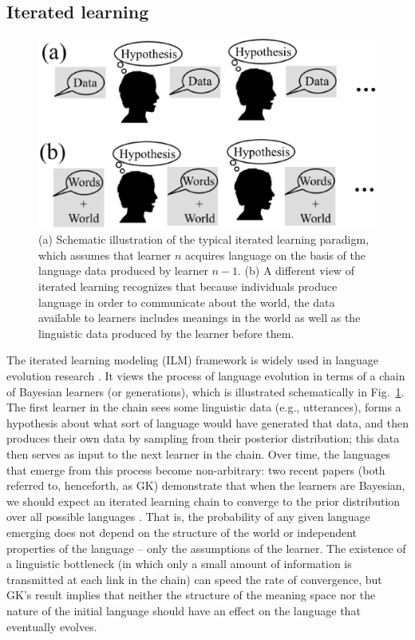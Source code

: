 \documentclass{apa}
\begin{document}
\subsection{Iterated learning}

\begin{figure}[t]
\begin{center}
\includegraphics[scale=0.5]{ilframework.eps}
\end{center}
\vspace{-5mm}
\caption{(a) Schematic illustration of the typical iterated learning paradigm, which assumes that learner $n$ acquires language on the basis of the language data produced by learner $n-1$. (b) A different view of iterated learning recognizes that because individuals produce language in order to communicate about the world, the data available to learners includes meanings in the world as well as the linguistic data produced by the learner before them.}
\label{fig:ilm}
\end{figure}


The iterated learning modeling (ILM) framework is widely used in language evolution research \cite{griffithskalish07, kirbyetal08,kirbyhurford02,smith09,realigriffiths09}. It views the process of language evolution in terms of a chain of Bayesian learners (or generations), which is illustrated schematically in Fig.~\ref{fig:ilm}. The first learner in the chain sees some linguistic data (e.g., utterances), forms a hypothesis about what sort of language would have generated that data, and then produces their own data by sampling from their posterior distribution; this data then serves as input to the next learner in the chain. Over time, the languages that emerge from this process become non-arbitrary: two recent papers (both referred to, henceforth, as GK) demonstrate that when the learners are Bayesian, we should expect an iterated learning chain to converge to the prior distribution over all possible languages \cite{griffithskalish05,griffithskalish07}. That is, the probability of any given language emerging does not depend on the structure of the world or independent properties of the language -- only the assumptions of the learner. The existence of a linguistic bottleneck (in which only a small amount of information is transmitted at each link in the chain) can speed the rate of convergence, but GK's result implies that neither the structure of the meaning space nor the nature of the initial language should have an effect on the language that eventually evolves.
\end{document}
